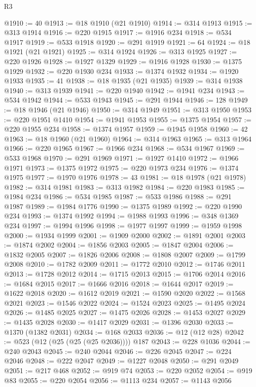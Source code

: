 \begin{lexlean}{R3}
\begin{coremodule}
@1910 := 40
@1913 := @18 @1910 (@21 @1910)
@1914 := @314 @1913
@1915 := @313 @1914
@1916 := @220 @1915
@1917 := @1916 @234
@1918 := @534 @1917
@1919 := @533 @1918
@1920 := @291 @1919
@1921 := 64
@1924 := @18 @1921 (@21 @1921)
@1925 := @314 @1924
@1926 := @313 @1925
@1927 := @220 @1926
@1928 := @1927 @1329
@1929 := @1916 @1928
@1930 := @1375 @1929
@1932 := @220 @1930 @234
@1933 := @1374 @1932
@1934 := @1920 @1933
@1935 := 41
@1938 := @18 @1935 (@21 @1935)
@1939 := @314 @1938
@1940 := @313 @1939
@1941 := @220 @1940
@1942 := @1941 @234
@1943 := @534 @1942
@1944 := @533 @1943
@1945 := @291 @1944
@1946 := 128
@1949 := @18 @1946 (@21 @1946)
@1950 := @314 @1949
@1951 := @313 @1950
@1953 := @220 @1951 @1410
@1954 := @1941 @1953
@1955 := @1375 @1954
@1957 := @220 @1955 @234
@1958 := @1374 @1957
@1959 := @1945 @1958
@1960 := 42
@1963 := @18 @1960 (@21 @1960)
@1964 := @314 @1963
@1965 := @313 @1964
@1966 := @220 @1965
@1967 := @1966 @234
@1968 := @534 @1967
@1969 := @533 @1968
@1970 := @291 @1969
@1971 := @1927 @1410
@1972 := @1966 @1971
@1973 := @1375 @1972
@1975 := @220 @1973 @234
@1976 := @1374 @1975
@1977 := @1970 @1976
@1978 := 43
@1981 := @18 @1978 (@21 @1978)
@1982 := @314 @1981
@1983 := @313 @1982
@1984 := @220 @1983
@1985 := @1984 @234
@1986 := @534 @1985
@1987 := @533 @1986
@1988 := @291 @1987
@1989 := @1984 @1776
@1990 := @1375 @1989
@1992 := @220 @1990 @234
@1993 := @1374 @1992
@1994 := @1988 @1993
@1996 := @348 @1369 @234
@1997 := @1994 @1996
@1998 := @1977 @1997
@1999 := @1959 @1998
@2000 := @1934 @1999
@2001 := @1909 @2000
@2002 := @1891 @2001
@2003 := @1874 @2002
@2004 := @1856 @2003
@2005 := @1847 @2004
@2006 := @1832 @2005
@2007 := @1826 @2006
@2008 := @1808 @2007
@2009 := @1799 @2008
@2010 := @1782 @2009
@2011 := @1772 @2010
@2012 := @1746 @2011
@2013 := @1728 @2012
@2014 := @1715 @2013
@2015 := @1706 @2014
@2016 := @1684 @2015
@2017 := @1666 @2016
@2018 := @1644 @2017
@2019 := @1622 @2018
@2020 := @1612 @2019
@2021 := @1590 @2020
@2022 := @1568 @2021
@2023 := @1546 @2022
@2024 := @1524 @2023
@2025 := @1495 @2024
@2026 := @1485 @2025
@2027 := @1475 @2026
@2028 := @1453 @2027
@2029 := @1435 @2028
@2030 := @1417 @2029
@2031 := @1396 @2030
@2033 := @1370 (@1382 @2031)
@2034 := @168 @2033
@2036 := @12 (@12 @28)
@2042 := @523 (@12 (@25 (@25 (@25 @2036)))) @187
@2043 := @228 @1036
@2044 := @240 @2043
@2045 := @240 @2044
@2046 := @226 @2045
@2047 := @224 @2046
@2048 := @222 @2047
@2049 := @1227 @2048
@2050 := @291 @2049
@2051 := @217 @468
@2052 := @919 @74
@2053 := @220 @2052
@2054 := @919 @83
@2055 := @220 @2054
@2056 := @1113 @234
@2057 := @1143 @2056

\end{coremodule}
\end{lexlean}
